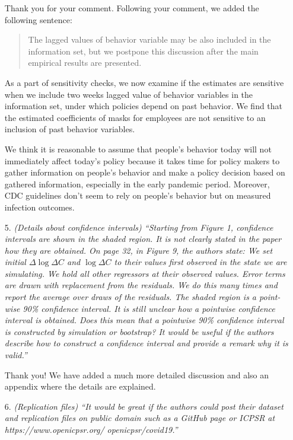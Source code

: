 \documentclass[11pt]{article}
\begin{document}
\begin{itemize}
Thank you for your comment. Following your comment, we added the following sentence:
\begin{quote}
The  lagged values of behavior variable may be also included in the information set, but we postpone this discussion after the main empirical results are presented.
\end{quote} 
As a part of sensitivity checks, we now examine if the estimates are sensitive when we include two weeks lagged value of behavior variables in the information set, under which policies depend on past behavior. We find that the estimated coefficients of masks for employees are not sensitive to an inclusion of past behavior variables. 
 
We think it is reasonable to assume that people's behavior today will not immediately affect today's policy because it takes time for policy makers to gather information on people's behavior and make a policy decision based on gathered information, especially in the early pandemic period.   Moreover, CDC guidelines don't seem to rely on people's behavior but on measured infection outcomes.
  
\item[5.]  \textit{(Details about confidence intervals) ``Starting from Figure 1, confidence intervals are shown
in the shaded region. It is not clearly stated in the paper how they are obtained. On page 32,
in Figure 9, the authors state:
We set initial $\Delta\log\Delta C$ and $\log\Delta C$  to their values first observed in the state we
are simulating. We hold all other regressors at their observed values. Error terms
are drawn with replacement from the residuals. We do this many times and report
the average over draws of the residuals. The shaded region is a point-wise 90\%
confidence interval. It is still unclear how a pointwise confidence interval is obtained. Does this mean that a pointwise
90\% confidence interval is constructed by simulation or bootstrap? It would be useful if the authors describe how to construct a confidence interval and provide a remark why it is valid.''}

Thank you! We have added a much more detailed discussion and also an appendix where the details
are explained.
  
\item[6.]  \textit{(Replication files) ``It would be great if the authors could post their dataset and replication
files on public domain such as a GitHub page or ICPSR at https://www.openicpsr.org/
openicpsr/covid19.''}


\end{itemize}
\end{document}
